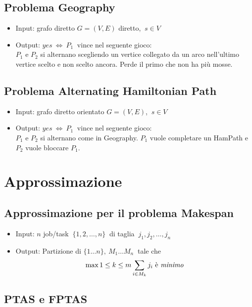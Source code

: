 \documentclass[a4paper]{article}
\theoremstyle{definition}
\begin{document}
		\subsection{Problema Geography}
			\begin{itemize}
				\item Input: grafo diretto $ G = (V, E) $ diretto, $ \ s \in V $
				\item Output: $ yes \ \Leftrightarrow\ P_1 \ $ vince nel seguente gioco:\\
				$ P_1 $ e $ P_2 $ si alternano scegliendo un vertice collegato da un arco nell'ultimo vertice scelto e non scelto ancora. Perde il primo che non ha più mosse.
			\end{itemize}
		
		\subsection{Problema Alternating Hamiltonian Path}
			\begin{itemize}
				\item Input: grafo diretto orientato $ G = (V, E) $, $ \ s\in V $
				\item Output: $ yes\ \Leftrightarrow\ P_1 \ $ vince nel seguente gioco:\\
				$ P_1 $ e $ P_2 $ si alternano come in Geography. $ P_1 $ vuole completare un HamPath e $ P_2 $ vuole bloccare $ P_1 $.
			\end{itemize}
		
		
	\section{Approssimazione}
		
		\subsection{Approssimazione per il problema Makespan}
			\begin{itemize}
				\item Input: $ n $ job/task $ \ \{1, 2,\dots, n \} \ $ di taglia $ \ j_1, j_2,\dots, j_n $
				\item Output: Partizione di $ \{1 \dots n \},\ M_1 \dots M_n \ $ tale che
				\[
					\max\limits{1\leq k\leq m} \sum\limits_{i\in M_k} j_i \text{ è \textit{minimo}}
				\]
			\end{itemize}
			
		\subsection{PTAS e FPTAS}
		
\end{document}
